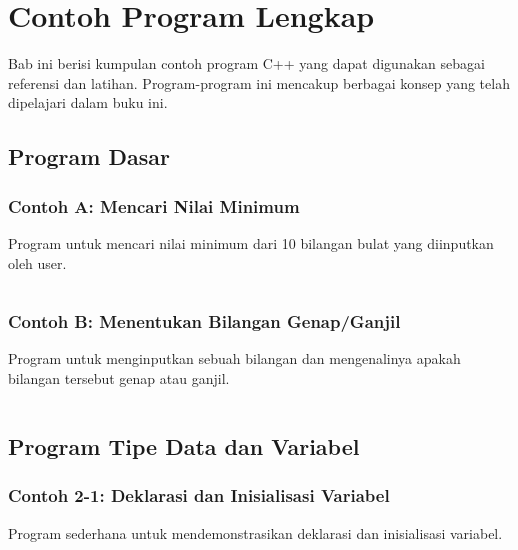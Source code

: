 \chapter{Contoh Program Lengkap}

Bab ini berisi kumpulan contoh program C++ yang dapat digunakan sebagai referensi dan latihan. Program-program ini mencakup berbagai konsep yang telah dipelajari dalam buku ini.

\section{Program Dasar}

\subsection{Contoh A: Mencari Nilai Minimum}

Program untuk mencari nilai minimum dari 10 bilangan bulat yang diinputkan oleh user.

\begin{lstlisting}[language=c++, caption=Program Mencari Nilai Minimum]

\end{lstlisting}

\subsection{Contoh B: Menentukan Bilangan Genap/Ganjil}

Program untuk menginputkan sebuah bilangan dan mengenalinya apakah bilangan tersebut genap atau ganjil.

\begin{lstlisting}[language=c++, caption=Program Menentukan Bilangan Genap/Ganjil]

\end{lstlisting}

\section{Program Tipe Data dan Variabel}

\subsection{Contoh 2-1: Deklarasi dan Inisialisasi Variabel}

Program sederhana untuk mendemonstrasikan deklarasi dan inisialisasi variabel.

